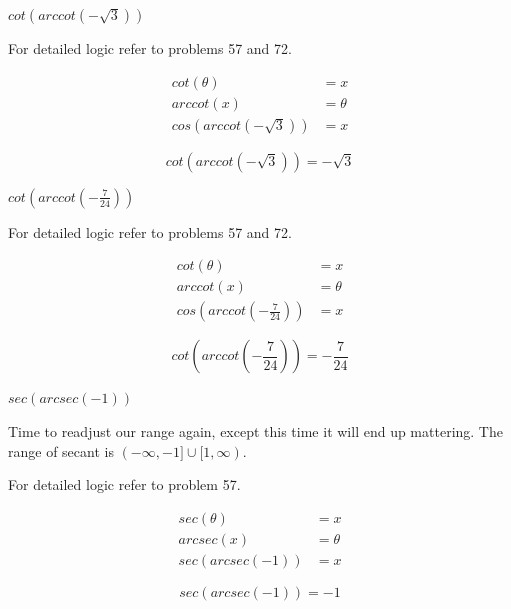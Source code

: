 \documentclass[10pt,letterpaper]{amspset}
\begin{document}
\begin{problem}[73]
    $cot \left(arccot \left( -\sqrt{3} \right)\right)$
\end{problem}

\begin{solution}
    For detailed logic refer to problems 57 and 72. 
    
    \begin{align}
        cot(\theta) &= x \\
        arccot(x) &= \theta \\
        cos \left(arccot \left( -\sqrt{3} \right)\right) &= x 
    \end{align}
    
    \[\boxed{ cot \left(arccot \left( -\sqrt{3} \right)\right) = -\sqrt{3} } \]
\end{solution}


\pagebreak


\begin{problem}[74]
    $cot \left(arccot \left( -\frac{7}{24} \right)\right)$
\end{problem}

\begin{solution}
    For detailed logic refer to problems 57 and 72. 
    
    \begin{align}
        cot(\theta) &= x \\
        arccot(x) &= \theta \\
        cos \left(arccot \left( -\frac{7}{24} \right)\right) &= x 
    \end{align}
    
    \[\boxed{ cot \left(arccot \left( -\frac{7}{24} \right)\right) = -\frac{7}{24} } \]
\end{solution}


\begin{problem}[78]
    $sec \left(arcsec \left( -1 \right)\right)$
\end{problem}

\begin{solution}
    Time to readjust our range again, except this time it will end up mattering. The range of secant is \linebreak $(-\infty, -1] \cup [1, \infty)$.
    
    For detailed logic refer to problem 57. 
    
    \begin{align}
        sec(\theta) &= x \\
        arcsec(x) &= \theta \\
        sec \left(arcsec \left( -1 \right)\right) &= x 
    \end{align}
    
    \[\boxed{ sec \left(arcsec \left( -1 \right)\right) = -1 } \]
\end{solution}
\end{document}
